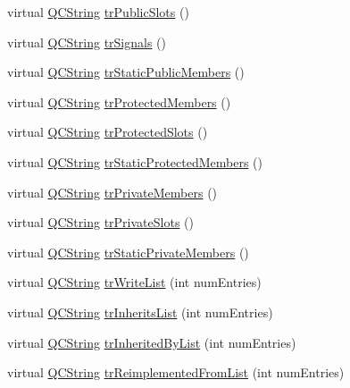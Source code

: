 \begin{DoxyCompactItemize}
\item 
virtual \hyperlink{class_q_c_string}{Q\+C\+String} \hyperlink{class_translator_greek_a867bf231be11dd813d69e9969b8a647b}{tr\+Public\+Slots} ()
\item 
virtual \hyperlink{class_q_c_string}{Q\+C\+String} \hyperlink{class_translator_greek_a3736e4f7acff83054e5b565bedec14d7}{tr\+Signals} ()
\item 
virtual \hyperlink{class_q_c_string}{Q\+C\+String} \hyperlink{class_translator_greek_a72101f89ae18fb27acc6c252e1092b80}{tr\+Static\+Public\+Members} ()
\item 
virtual \hyperlink{class_q_c_string}{Q\+C\+String} \hyperlink{class_translator_greek_ae0f69a50729e3b890705382639a5fddf}{tr\+Protected\+Members} ()
\item 
virtual \hyperlink{class_q_c_string}{Q\+C\+String} \hyperlink{class_translator_greek_a51076f8c36095ff863ed2d01c08efd45}{tr\+Protected\+Slots} ()
\item 
virtual \hyperlink{class_q_c_string}{Q\+C\+String} \hyperlink{class_translator_greek_a13bc70a944399d1bfe6d64100c418651}{tr\+Static\+Protected\+Members} ()
\item 
virtual \hyperlink{class_q_c_string}{Q\+C\+String} \hyperlink{class_translator_greek_aab238b3e55323ea12db6ae70777f4718}{tr\+Private\+Members} ()
\item 
virtual \hyperlink{class_q_c_string}{Q\+C\+String} \hyperlink{class_translator_greek_a484b71536f89a109d9080701c95b0639}{tr\+Private\+Slots} ()
\item 
virtual \hyperlink{class_q_c_string}{Q\+C\+String} \hyperlink{class_translator_greek_aff413fec06f6e2c28a0b677f0fdb05d7}{tr\+Static\+Private\+Members} ()
\item 
virtual \hyperlink{class_q_c_string}{Q\+C\+String} \hyperlink{class_translator_greek_afb975a900ede5cf426effbd69025ba9a}{tr\+Write\+List} (int num\+Entries)
\item 
virtual \hyperlink{class_q_c_string}{Q\+C\+String} \hyperlink{class_translator_greek_a6a9bd657b94b41190ccd80bdcd261f25}{tr\+Inherits\+List} (int num\+Entries)
\item 
virtual \hyperlink{class_q_c_string}{Q\+C\+String} \hyperlink{class_translator_greek_a27fc0764a3c58e99d12159432a7f38cb}{tr\+Inherited\+By\+List} (int num\+Entries)
\item 
virtual \hyperlink{class_q_c_string}{Q\+C\+String} \hyperlink{class_translator_greek_a1b4f84ad052156793fc5e4005a40685e}{tr\+Reimplemented\+From\+List} (int num\+Entries)
\item 

\end{DoxyCompactItemize}
